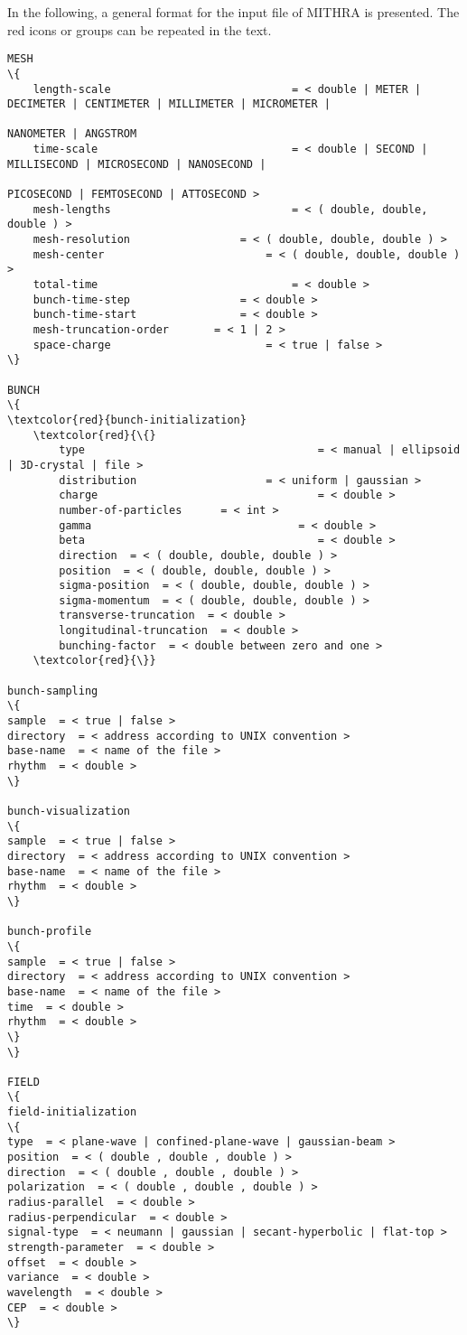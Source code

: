 \documentclass[a4paper]{article}
\begin{document}
%
In the following, a general format for the input file of MITHRA is presented. The red icons or groups can be repeated in the text. 

\begin{Verbatim}[fontsize=\footnotesize, tabsize=2, fontfamily=courier,	fontseries=b, commandchars=\\\{\}]
MESH
\{
	length-scale							= < double | METER | DECIMETER | CENTIMETER | MILLIMETER | MICROMETER | 
																NANOMETER | ANGSTROM
	time-scale								= < double | SECOND | MILLISECOND | MICROSECOND | NANOSECOND | 
																PICOSECOND | FEMTOSECOND | ATTOSECOND >
	mesh-lengths							= < ( double, double, double ) >
	mesh-resolution		 			= < ( double, double, double ) >
	mesh-center				 			= < ( double, double, double ) >
	total-time								= < double >
	bunch-time-step		 			= < double >
	bunch-time-start  				= < double >
	mesh-truncation-order 		= < 1 | 2 >
	space-charge  						= < true | false >
\}

BUNCH
\{
\textcolor{red}{bunch-initialization}
	\textcolor{red}{\{}
		type  									= < manual | ellipsoid | 3D-crystal | file >
		distribution  					= < uniform | gaussian >
		charge  								= < double >
		number-of-particles  	 = < int >
		gamma  								 = < double >
		beta  									= < double >
		direction  = < ( double, double, double ) >
		position  = < ( double, double, double ) >
		sigma-position  = < ( double, double, double ) >
		sigma-momentum  = < ( double, double, double ) >
		transverse-truncation  = < double >
		longitudinal-truncation  = < double >
		bunching-factor  = < double between zero and one >
	\textcolor{red}{\}}

bunch-sampling
\{
sample  = < true | false >
directory  = < address according to UNIX convention >
base-name  = < name of the file >
rhythm  = < double >
\}

bunch-visualization
\{
sample  = < true | false >
directory  = < address according to UNIX convention >
base-name  = < name of the file >
rhythm  = < double >
\}

bunch-profile
\{
sample  = < true | false >
directory  = < address according to UNIX convention >
base-name  = < name of the file >
time  = < double >
rhythm  = < double >
\}
\}

FIELD
\{
field-initialization
\{
type  = < plane-wave | confined-plane-wave | gaussian-beam >
position  = < ( double , double , double ) >
direction  = < ( double , double , double ) >
polarization  = < ( double , double , double ) >
radius-parallel  = < double >
radius-perpendicular  = < double >
signal-type  = < neumann | gaussian | secant-hyperbolic | flat-top >
strength-parameter  = < double >
offset  = < double >
variance  = < double >
wavelength  = < double >
CEP  = < double >
\}


\end{Verbatim}
\end{document}
